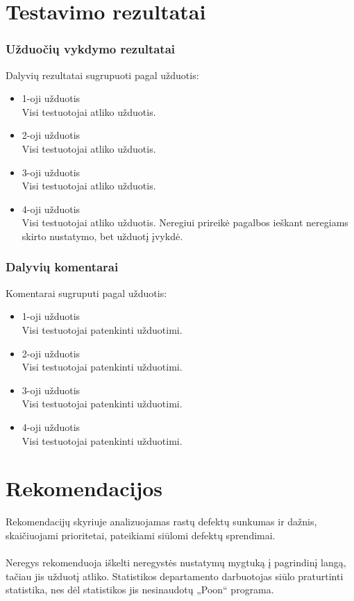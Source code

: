 \documentclass{VUMIFPSkursinis}
\begin{document}
\section{Testavimo rezultatai}
\subsubsection{Užduočių vykdymo rezultatai}
Dalyvių rezultatai sugrupuoti pagal užduotis:
	\begin{itemize}
	\item 1-oji užduotis \\
Visi testuotojai atliko užduotis.
	\item 2-oji užduotis \\
Visi testuotojai atliko užduotis.
	\item 3-oji užduotis \\
Visi testuotojai atliko užduotis.
	\item 4-oji užduotis \\
Visi testuotojai atliko užduotis. Neregiui prireikė pagalbos ieškant neregiams skirto nustatymo, bet užduotį įvykdė.
	\end{itemize}
\subsubsection{Dalyvių komentarai}
Komentarai sugruputi pagal užduotis:
	\begin{itemize}
	\item 1-oji užduotis \\
	Visi testuotojai patenkinti užduotimi.
	\item 2-oji užduotis \\
	Visi testuotojai patenkinti užduotimi.
	\item 3-oji užduotis \\
	Visi testuotojai patenkinti užduotimi.
	\item 4-oji užduotis \\
Visi testuotojai patenkinti užduotimi.
	\end{itemize}

\section{Rekomendacijos}
Rekomendacijų skyriuje analizuojamas rastų defektų sunkumas ir dažnis, skaičiuojami prioritetai, pateikiami siūlomi defektų sprendimai. \\ \\
Neregys rekomenduoja iškelti neregystės nustatymų mygtuką į pagrindinį langą, tačiau jis užduotį atliko. Statistikos departamento darbuotojas siūlo praturtinti statistika, nes dėl statistikos jis nesinaudotų „Poon“ programa.
\end{document}
